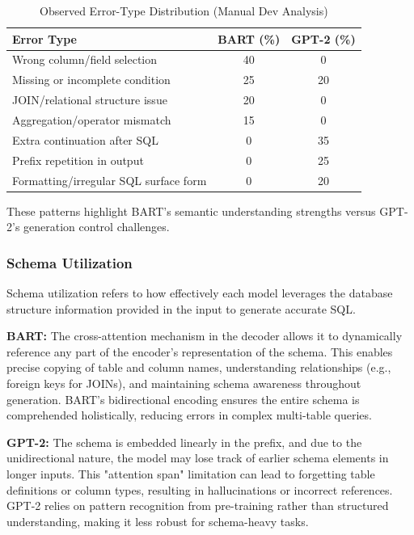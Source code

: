 \begin{table}[htbp]
\caption{Observed Error-Type Distribution (Manual Dev Analysis)}
\begin{center}
\begin{tabular}{|l|c|c|}
\hline
\textbf{Error Type} & \textbf{BART (\%)} & \textbf{GPT-2 (\%)} \\
\hline
Wrong column/field selection & 40 & 0 \\
\hline
Missing or incomplete condition & 25 & 20 \\
\hline
JOIN/relational structure issue & 20 & 0 \\
\hline
Aggregation/operator mismatch & 15 & 0 \\
\hline
Extra continuation after SQL & 0 & 35 \\
\hline
Prefix repetition in output & 0 & 25 \\
\hline
Formatting/irregular SQL surface form & 0 & 20 \\
\hline
\end{tabular}
\label{tab:q1_error_distribution}
\end{center}
\end{table}

These patterns highlight BART's semantic understanding strengths versus GPT-2's generation control challenges.

\subsubsection{Schema Utilization}
Schema utilization refers to how effectively each model leverages the database structure information provided in the input to generate accurate SQL.

\textbf{BART:} The cross-attention mechanism in the decoder allows it to dynamically reference any part of the encoder's representation of the schema. This enables precise copying of table and column names, understanding relationships (e.g., foreign keys for JOINs), and maintaining schema awareness throughout generation. BART's bidirectional encoding ensures the entire schema is comprehended holistically, reducing errors in complex multi-table queries.

\textbf{GPT-2:} The schema is embedded linearly in the prefix, and due to the unidirectional nature, the model may lose track of earlier schema elements in longer inputs. This "attention span" limitation can lead to forgetting table definitions or column types, resulting in hallucinations or incorrect references. GPT-2 relies on pattern recognition from pre-training rather than structured understanding, making it less robust for schema-heavy tasks.

